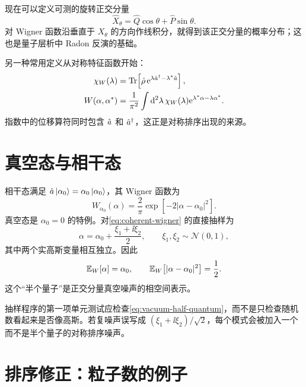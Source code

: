 现在可以定义可测的旋转正交分量
\begin{equation}
  \hat X_\theta=\hat Q\cos\theta+\hat P\sin\theta.
\end{equation}
对 Wigner 函数沿垂直于 $X_\theta$ 的方向作线积分，就得到该正交分量的概率分布；这也是量子层析中 Radon 反演的基础。

另一种常用定义从对称特征函数开始：
\begin{align}
  \chi_W(\lambda)&=\operatorname{Tr}\!\left[\hat\rho\,
  \mathrm{e}^{\lambda\hat a^{\dagger}-\lambda^*\hat a}\right],\\
  W(\alpha,\alpha^*)&=\frac{1}{\pi^2}
  \int\mathop{}\!\mathrm{d}^2\lambda\,\chi_W(\lambda)
  \mathrm{e}^{\lambda^*\alpha-\lambda\alpha^*}.
  \label{eq:wigner-characteristic}
\end{align}
指数中的位移算符同时包含 $\hat a$ 和 $\hat a^{\dagger}$，这正是对称排序出现的来源。

\section{真空态与相干态}

相干态满足 $\hat a\left\lvert \alpha_0\right\rangle=\alpha_0\left\lvert \alpha_0\right\rangle$，其 Wigner 函数为
\begin{equation}
  W_{\alpha_0}(\alpha)
  =\frac{2}{\pi}\exp\!\left[-2|\alpha-\alpha_0|^2\right].
  \label{eq:coherent-wigner}
\end{equation}
真空态是 $\alpha_0=0$ 的特例。对\cref{eq:coherent-wigner} 的直接抽样为
\begin{equation}
  \alpha=\alpha_0+\frac{\xi_1+\ii\xi_2}{2},
  \qquad \xi_1,\xi_2\sim\mathcal{N}(0,1),
  \label{eq:coherent-sampling}
\end{equation}
其中两个实高斯变量相互独立。因此
\begin{equation}
  \mathbb{E}_{W}\!\left[\alpha\right]=\alpha_0,
  \qquad
  \mathbb{E}_{W}\!\left[|\alpha-\alpha_0|^2\right]=\frac12.
  \label{eq:vacuum-half-quantum}
\end{equation}
这个“半个量子”是正交分量真空噪声的相空间表示。

\begin{numericalbox}
抽样程序的第一项单元测试应检查\cref{eq:vacuum-half-quantum}，而不是只检查随机数看起来是否像高斯。若复噪声误写成 $(\xi_1+\ii\xi_2)/\sqrt{2}$，每个模式会被加入一个而不是半个量子的对称排序噪声。
\end{numericalbox}

\section{排序修正：粒子数的例子}

